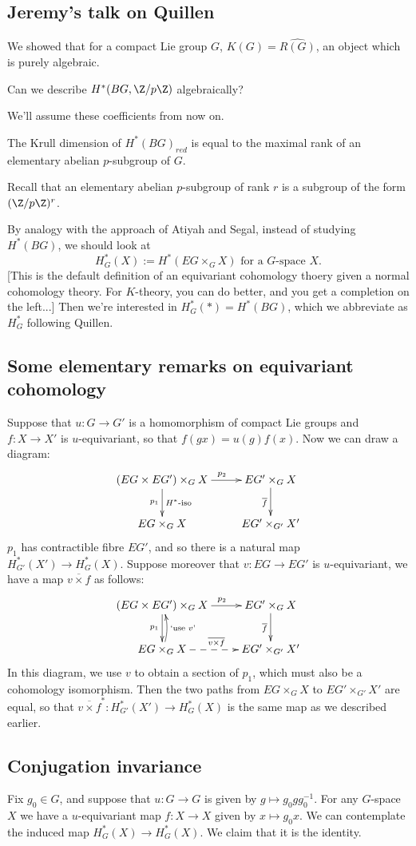 \documentclass[11pt]{article}
\newcommand{\KanSemResponse}[1]
{
\thispagestyle{fancy}
\subsection*{#1}
}
\begin{document}
\begin{JeremyQuillen}
\KanSemResponse
{Jeremy's talk on Quillen}
We showed that for a compact Lie group $G$, $K(G)=\widehat{R(G)}$, an object which is purely algebraic.
\begin{question}
Can we describe $H^*(BG,\Z/p\Z)$ algebraically?
\end{question}
We'll assume these coefficients from now on.
\begin{conjecture}
The Krull dimension of $H^*(BG)_{red}$ is equal to the maximal rank of an elementary abelian $p$-subgroup of $G$.
\end{conjecture}
\noindent Recall that an elementary abelian $p$-subgroup of rank $r$ is a subgroup of the form $(\Z/p\Z)^r$.

By analogy with the approach of Atiyah and Segal, instead of studying $H^*(BG)$, we should look at 
\[H^*_G(X):=H^*(EG\times_G X)\text{ for a $G$-space $X$}.\]
[This is the default definition of an equivariant cohomology thoery given a normal cohomology theory. For $K$-theory, you can do better, and you get a completion on the left...]
Then we're interested in $H^*_G(\ast)=H^*(BG)$, which we abbreviate as $H_G^*$ following Quillen.
\subsection*{Some elementary remarks on equivariant cohomology}
Suppose that $u:G\to G'$ is a homomorphism of compact Lie groups and $f:X\to X'$ is $u$-equivariant, so that $f(gx)=u(g)f(x)$. Now we can draw a diagram:
\[\xymatrix{
(EG\times EG')\times_G X\ar[r]^{\ \ \ p_2}\ar[d]_{p_1}^{\text{$H^*$-iso}}&EG'\times_GX\ar[d]_{\overline f}\\
EG\times_G X&EG'\times_{G'}X'
}\]
$p_1$ has contractible fibre $EG'$, and so there is a natural map $H^*_{G'}(X')\to H^*_{G}(X)$. Suppose moreover that $v:EG\to EG'$ is $u$-equivariant, we have a map ${\overline{v\times f}}$ as follows:
\[\xymatrix{
(EG\times EG')\times_G X\ar[r]^{\ \ \ p_2}\ar[d]_{p_1}&EG'\times_GX\ar[d]_{\overline f}\\
\ar@/_1ex/[u]_{\text{`use $v$'}}\ar@{-->}[r]^{\overline{v\times f}}EG\times_G X&EG'\times_{G'}X'
}\]
In this diagram, we use $v$ to obtain a section of $p_1$, which must also be a cohomology isomorphism. Then the two paths from $EG\times_G X$ to $EG'\times_{G'}X'$ are equal, so that $\overline{v\times f}^*:H^*_{G'}(X')\to H^*_{G}(X)$ is the same map as we described earlier.
\subsection*{Conjugation invariance}
Fix $g_0\in G$, and suppose that $u:G\to G$ is given by $g\mapsto g_0gg_0^{-1}$. For any $G$-space $X$ we have a $u$-equivariant map $f:X\to X$ given by $x\mapsto g_0x$. We can contemplate the induced map $H^*_G(X)\to H^*_G(X)$. We claim that it is the identity.


\end{JeremyQuillen}
\end{document}
